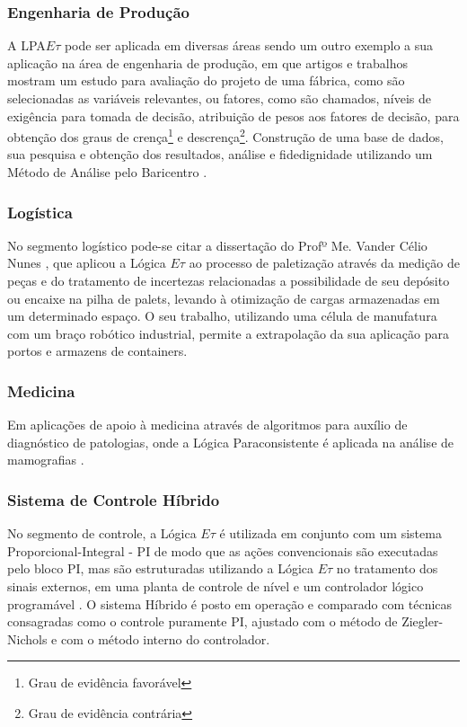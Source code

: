 \subsubsection{Engenharia de Produção}

A LPA$E\tau$ pode ser aplicada em diversas áreas sendo um outro
exemplo a sua aplicação na área de engenharia de produção,
em que artigos e trabalhos mostram um estudo para avaliação do projeto
de uma fábrica, como são selecionadas as variáveis relevantes, ou
fatores, como são chamados, níveis de exigência para tomada de decisão, 
atribuição de pesos aos fatores de decisão, para obtenção dos graus de
crença\footnote{Grau de evidência favorável} e
descrença\footnote{Grau de evidência contrária}. 
Construção de uma base de dados, sua pesquisa e obtenção dos
resultados, análise e fidedignidade utilizando um Método de Análise
pelo Baricentro
\cite{FabioIsraelJair}.


\subsubsection{Logística}

No segmento logístico pode-se citar a dissertação do Profº Me. Vander Célio Nunes \cite{Vander}, que aplicou a Lógica $E\tau$ ao processo de paletização através da medição de peças e do tratamento de incertezas relacionadas a possibilidade de seu depósito ou encaixe na pilha de palets, levando à otimização de cargas armazenadas em um determinado espaço. 
O seu trabalho, utilizando uma célula de manufatura com um braço robótico industrial, permite a extrapolação da sua aplicação para portos e armazens de containers.



\subsubsection{Medicina}

Em aplicações de apoio à medicina através de algoritmos para
auxílio de diagnóstico de patologias,
onde a Lógica Paraconsistente é aplicada na análise de mamografias
\cite{MauricioCM}.



\subsubsection{Sistema de Controle Híbrido}

No segmento de controle, a Lógica $E\tau$ é utilizada em conjunto com um sistema Proporcional-Integral - PI de modo que as ações convencionais são executadas pelo bloco PI, mas são estruturadas utilizando a Lógica $E\tau$ no tratamento dos sinais externos, 
em uma planta de controle de nível e um controlador lógico programável
 \cite{Marcelo}. 
O sistema Híbrido é posto em operação e comparado com técnicas consagradas como o controle puramente PI, ajustado com o método de Ziegler-Nichols e com o método interno do controlador. 




